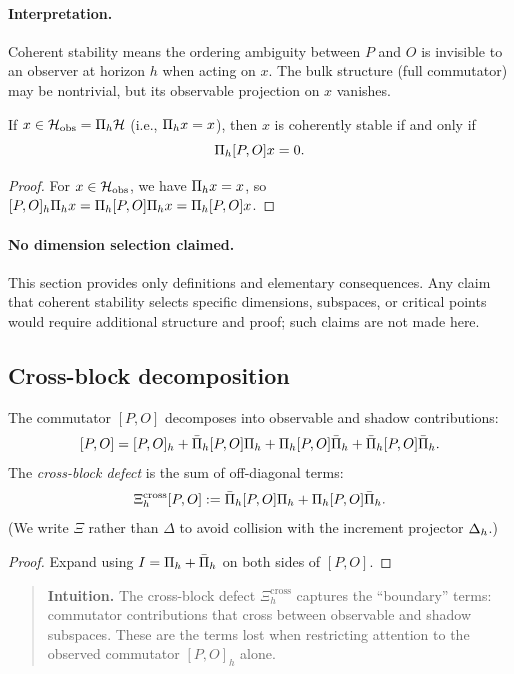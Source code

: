 \paragraph{Interpretation.}
Coherent stability means the ordering ambiguity between $P$ and $O$ is
invisible to an observer at horizon $h$ when acting on $x$. The bulk structure
(full commutator) may be nontrivial, but its observable projection on $x$
vanishes.

\begin{proposition}
\label{prop:coherent-stability}
If $x \in \mathcal{H}_{\mathrm{obs}} = \Pi_{h} \mathcal{H}$ (i.e., $\Pi_{h} x = x$), then $x$ is coherently stable if and only if
\[
\Pi_{h} [P, O] x = 0.
\]
\end{proposition}

\begin{proof}
For $x \in \mathcal{H}_{\mathrm{obs}}$, we have $\Pi_{h} x = x$, so $[P,O]_h \Pi_{h} x = \Pi_{h} [P,O] \Pi_{h} x = \Pi_{h} [P,O] x$.
\end{proof}

\paragraph{No dimension selection claimed.}
This section provides only definitions and elementary consequences. Any claim
that coherent stability selects specific dimensions, subspaces, or critical
points would require additional structure and proof; such claims are not made
here.

\subsection{Cross-block decomposition}

\begin{proposition}
\label{prop:holographic-decomposition}
The commutator $[P,O]$ decomposes into observable and shadow contributions:
\[
[P,O] = [P,O]_h + \bar{\Pi}_{h} [P,O] \Pi_{h} + \Pi_{h} [P,O] \bar{\Pi}_{h} + \bar{\Pi}_{h} [P,O] \bar{\Pi}_{h}.
\]
The \emph{cross-block defect} is the sum of off-diagonal terms:
\[
\Xi_h^{\mathrm{cross}}[P,O] := \bar{\Pi}_{h} [P,O] \Pi_{h} + \Pi_{h} [P,O] \bar{\Pi}_{h}.
\]
(We write $\Xi$ rather than $\Delta$ to avoid collision with the increment projector $\Delta_{h}$.)
\end{proposition}

\begin{proof}
Expand using $I = \Pi_{h} + \bar{\Pi}_{h}$ on both sides of $[P,O]$.
\end{proof}

\begin{quote}\small
\textbf{Intuition.}
The cross-block defect $\Xi_h^{\mathrm{cross}}$ captures the ``boundary'' terms: commutator contributions that cross between observable and shadow subspaces.
These are the terms lost when restricting attention to the observed commutator $[P,O]_h$ alone.
\end{quote}

